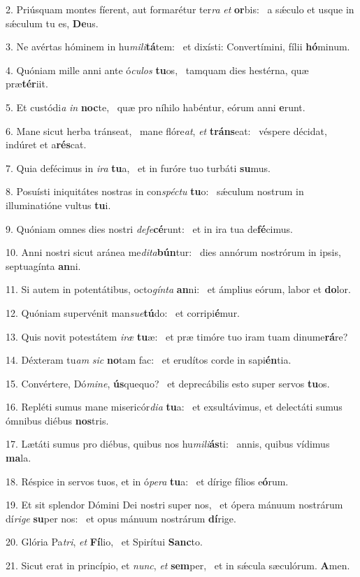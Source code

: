 2. Priúsquam montes fíerent, aut formarétur ter\textit{ra} \textit{et} \textbf{or}bis: \ast\  a sǽculo et usque in sǽculum tu es, \textbf{De}us.\

3. Ne avértas hóminem in hu\textit{mi}\textit{li}\textbf{tá}tem: \ast\  et dixísti: Convertímini, fílii \textbf{hó}minum.\

4. Quóniam mille anni ante ó\textit{cu}\textit{los} \textbf{tu}os, \ast\  tamquam dies hestérna, quæ præ\textbf{tér}iit.\

5. Et custódi\textit{a} \textit{in} \textbf{noc}te, \ast\  quæ pro níhilo habéntur, eórum anni \textbf{e}runt.\

6. Mane sicut herba tránseat, \dag\  mane flóre\textit{at}, \textit{et} \textbf{tráns}eat: \ast\  véspere décidat, indúret et a\textbf{rés}cat.\

7. Quia defécimus in \textit{i}\textit{ra} \textbf{tu}a, \ast\  et in furóre tuo turbáti \textbf{su}mus.\

8. Posuísti iniquitátes nostras in con\textit{spéc}\textit{tu} \textbf{tu}o: \ast\  sǽculum nostrum in illuminatióne vultus \textbf{tu}i.\

9. Quóniam omnes dies nostri \textit{de}\textit{fe}\textbf{cé}runt: \ast\  et in ira tua de\textbf{fé}cimus.\

10. Anni nostri sicut aránea me\textit{di}\textit{ta}\textbf{bún}tur: \ast\  dies annórum nostrórum in ipsis, septuagínta \textbf{an}ni.\

11. Si autem in potentátibus, octo\textit{gín}\textit{ta} \textbf{an}ni: \ast\  et ámplius eórum, labor et \textbf{do}lor.\

12. Quóniam supervénit man\textit{su}\textit{e}\textbf{tú}do: \ast\  et corripi\textbf{é}mur.\

13. Quis novit potestátem \textit{i}\textit{ræ} \textbf{tu}æ: \ast\  et præ timóre tuo iram tuam dinume\textbf{rá}re?\

14. Déxteram tu\textit{am} \textit{sic} \textbf{no}tam fac: \ast\  et erudítos corde in sapi\textbf{én}tia.\

15. Convértere, Dó\textit{mi}\textit{ne}, \textbf{ús}quequo? \ast\  et deprecábilis esto super servos \textbf{tu}os.\

16. Repléti sumus mane misericór\textit{di}\textit{a} \textbf{tu}a: \ast\  et exsultávimus, et delectáti sumus ómnibus diébus \textbf{nos}tris.\

17. Lætáti sumus pro diébus, quibus nos hu\textit{mi}\textit{li}\textbf{ás}ti: \ast\  annis, quibus vídimus \textbf{ma}la.\

18. Réspice in servos tuos, et in ó\textit{pe}\textit{ra} \textbf{tu}a: \ast\  et dírige fílios e\textbf{ó}rum.\

19. Et sit splendor Dómini Dei nostri super nos, \dag\  et ópera mánuum nostrárum dí\textit{ri}\textit{ge} \textbf{su}per nos: \ast\  et opus mánuum nostrárum \textbf{dí}rige.\

20. Glória Pa\textit{tri}, \textit{et} \textbf{Fí}lio, \ast\  et Spirítui \textbf{Sanc}to.\

21. Sicut erat in princípio, et \textit{nunc}, \textit{et} \textbf{sem}per, \ast\  et in sǽcula sæculórum. \textbf{A}men.\

